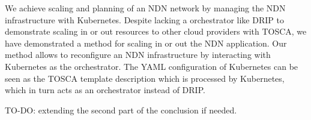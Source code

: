 We achieve scaling and planning of an NDN network by managing the NDN infrastructure with Kubernetes. Despite lacking a orchestrator like DRIP to demonstrate scaling in or out resources to other cloud providers with TOSCA, we have demonstrated a method for scaling in or out the NDN application. Our method allows to reconfigure an NDN infrastructure 
by interacting with Kubernetes as the orchestrator. The YAML configuration of Kubernetes can be seen as the TOSCA template description which is processed by Kubernetes, which in turn acts as an orchestrator instead of DRIP. 

TO-DO: extending the second part of the conclusion if needed.
